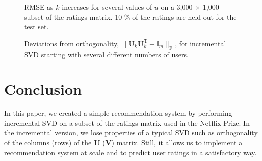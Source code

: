 \documentclass{article} %
\newcommand{\T}{\textrm{T}}
\begin{document}
\begin{figure}[H]
\begin{center}
\end{center}
\caption{RMSE as $k$ increases for several values of $u$ on a 3,000 $\times$ 1,000 subset of the ratings matrix. 10 \% of the ratings are held out for the test set.}
\label{fig:error_small}
\end{figure}

\begin{figure}[H]
\begin{center}
\end{center}
\caption{Deviations from orthogonality, 
$\|\mathbf{U}_k\mathbf{U}_k^{\T} - \mathbb{I}_m\|_{\textrm{F}}$, for
incremental SVD starting with several different numbers of users.}
\label{fig:ortho_small}
\end{figure}

\section{Conclusion}
In this paper, we created a simple recommendation system by performing incremental SVD on a subset of the ratings matrix used in the Netflix Prize.
In the incremental version, we lose properties of a typical SVD such as orthogonality of the columns (rows) of the $\mathbf{U}$ ($\mathbf{V}$) matrix.
Still, it allows us to implement a recommendation system at scale and to predict user ratings in a satisfactory way.




\end{document}
